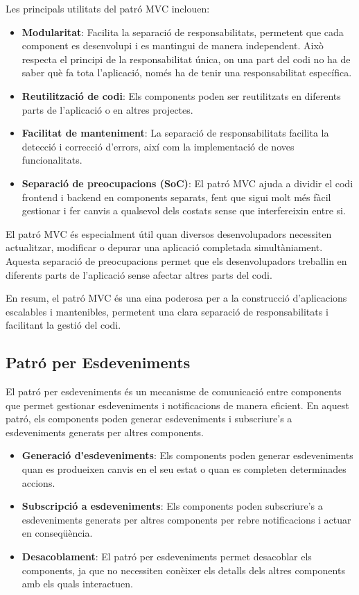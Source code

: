 \documentclass{ieeetj}
\begin{document}
Les principals utilitats del patró MVC inclouen:
\begin{itemize}
    \item \textbf{Modularitat}: Facilita la separació de responsabilitats, permetent que cada component es desenvolupi i es mantingui de manera independent. Això respecta el principi de la responsabilitat única, on una part del codi no ha de saber què fa tota l'aplicació, només ha de tenir una responsabilitat específica.
    \item \textbf{Reutilització de codi}: Els components poden ser reutilitzats en diferents parts de l'aplicació o en altres projectes.
    \item \textbf{Facilitat de manteniment}: La separació de responsabilitats facilita la detecció i correcció d'errors, així com la implementació de noves funcionalitats.
    \item \textbf{Separació de preocupacions (SoC)}: El patró MVC ajuda a dividir el codi frontend i backend en components separats, fent que sigui molt més fàcil gestionar i fer canvis a qualsevol dels costats sense que interfereixin entre si.
\end{itemize}

El patró MVC és especialment útil quan diversos desenvolupadors necessiten actualitzar, modificar o depurar una aplicació completada simultàniament. Aquesta separació de preocupacions permet que els desenvolupadors treballin en diferents parts de l'aplicació sense afectar altres parts del codi.

En resum, el patró MVC és una eina poderosa per a la construcció d'aplicacions escalables i mantenibles, permetent una clara separació de responsabilitats i facilitant la gestió del codi.

\subsection{Patró per Esdeveniments}
El patró per esdeveniments és un mecanisme de comunicació entre components que permet gestionar esdeveniments i notificacions de manera eficient. En aquest patró, els components poden generar esdeveniments i subscriure's a esdeveniments generats per altres components.

\begin{itemize}
    \item \textbf{Generació d'esdeveniments}: Els components poden generar esdeveniments quan es produeixen canvis en el seu estat o quan es completen determinades accions.
    \item \textbf{Subscripció a esdeveniments}: Els components poden subscriure's a esdeveniments generats per altres components per rebre notificacions i actuar en conseqüència.
    \item \textbf{Desacoblament}: El patró per esdeveniments permet desacoblar els components, ja que no necessiten conèixer els detalls dels altres components amb els quals interactuen.
\end{itemize}
\end{document}
